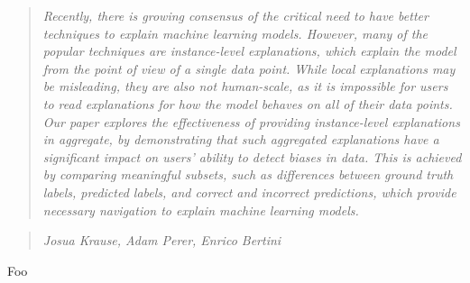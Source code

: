\begin{quote}\textit{
Recently, there is growing consensus of the critical need to have better techniques to explain machine learning models.  However, many of the popular techniques are instance-level explanations, which explain the model from the point of view of a single data point.  While local explanations may be misleading, they are also not human-scale, as it is impossible for users to read explanations for how the model behaves on all of their data points.  Our paper explores the effectiveness of providing instance-level explanations in aggregate, by demonstrating that such aggregated explanations have a significant impact on users' ability to detect biases in data.
This is achieved by comparing meaningful subsets, such as differences between ground truth labels, predicted labels, and correct and incorrect predictions, which provide necessary navigation to explain machine learning models.
}
\end{quote}

\begin{quote}
\textit{Josua Krause, Adam Perer, Enrico Bertini}
\end{quote}

\begin{contributions}{Foo}
\item {}
\end{contributions}

